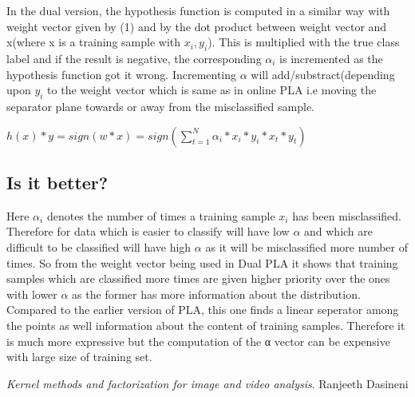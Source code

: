 \documentclass[a4paper,11pt]{article}
\begin{document}
In the dual version, the hypothesis function is computed in a similar way with weight vector given by (1) and by the dot product between weight vector and x(where x is a training sample with ${x_i, y_i}$). This is multiplied with the true class label and if the result is negative, the corresponding $\alpha_i$ is incremented as the hypothesis function got it wrong. Incrementing $\alpha$ will add/substract(depending upon $y_{i}$ to the weight vector which is same as in online PLA i.e moving the separator plane towards or away from the misclassified sample. \\

\begin{center}                                   
$h(x) * y = sign(w * x) = sign(\displaystyle\sum_{t=1}^N \alpha_{i} * x_i * y_i * x_t * y_t ) $
\end{center} 

\subsection*{Is it better?}

Here $\alpha_i$ denotes the number of times a training sample $x_i$ has been misclassified. Therefore for data which is easier to classify will have low $\alpha$ and which are difficult to be classified will have high $\alpha$ as it will be misclassified more number of times. So from the weight vector being used in Dual PLA it shows that training samples which are classified more times are given higher priority over the ones with lower $\alpha$ as the former has more information about the distribution. \\

Compared to the earlier version of PLA, this one finds a linear seperator among the points as well information about the content of training samples. Therefore it is much more expressive but the computation of the α vector can be expensive with large size of training set. 

\begin{thebibliography}{99}
 \textit{Kernel methods and factorization for image and video analysis}. Ranjeeth Dasineni 	  
\end{thebibliography}
\end{document}
